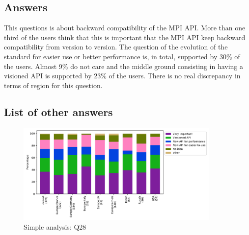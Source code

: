 
\subsection{Answers}


This questions is about backward compatibility of the MPI API. More than one
third of the users think that this is important that the MPI API keep backward
compatibility from version to version. The question of the evolution of the
standard for easier use or better performance is, in total,  supported by 30\%
of the users. Almost 9\% do not care and the middle ground consisting in having
a visioned API is supported by 23\% of the users. There is no real discrepancy in
terms of region for this question. 

\subsection{List of other answers}
\begin{itemize}

\end{itemize}

\begin{figure}[htb]
\begin{center}
\includegraphics[width=10cm]{../pdfs/Q28.pdf}
\caption{Simple analysis: Q28}
\label{fig:Q28}
\end{center}
\end{figure}
